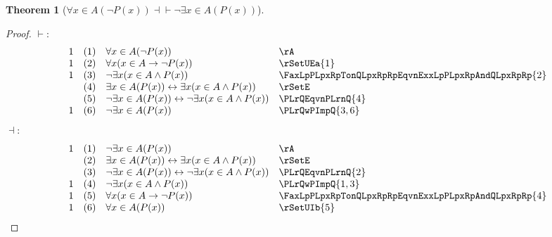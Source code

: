 \documentclass{book}
\theoremstyle{plain}
\newtheorem{theorem}{Theorem}
\theoremstyle{remark}
\theoremstyle{definition}
\begin{document}
\label{FaxInALpnPLpxRpRpEqvnExxInALpPLpxRpRp}
\begin{theorem}[\(\forall x \in A(\neg P(x)) \dashv\vdash \neg\exists x \in A(P(x))\)]
\end{theorem}
\begin{proof}
	\(\vdash:\)
	\[
	\begin{array}{llll}
		1 & (1) & \forall x \in A(\neg P(x)) & \rA \\
		1 & (2) & \forall x(x \in A \rightarrow \neg P(x)) & \rSetUEa{1} \\
		1 & (3) & \neg\exists x(x \in A \wedge P(x)) &  \FaxLpPLpxRpTonQLpxRpRpEqvnExxLpPLpxRpAndQLpxRpRp{2} \\
		& (4) & \exists x \in A(P(x)) \leftrightarrow \exists x(x \in A \wedge P(x)) & \rSetE \\
		& (5) & \neg \exists x \in A(P(x)) \leftrightarrow \neg \exists x(x \in A \wedge P(x)) & \PLrQEqvnPLrnQ{4} \\
		1 & (6) & \neg \exists x \in A(P(x)) & \PLrQwPImpQ{3,6} \\
	\end{array}
	\]
	\(\dashv:\)
	\[
	\begin{array}{llll}
		1 & (1) & \neg \exists x \in A(P(x)) & \rA \\
		& (2) & \exists x \in A(P(x)) \leftrightarrow \exists x(x \in A \wedge P(x)) & \rSetE \\
		& (3) & \neg \exists x \in A(P(x)) \leftrightarrow \neg \exists x(x \in A \wedge P(x)) & \PLrQEqvnPLrnQ{2} \\
		1 & (4) & \neg \exists x(x \in A \wedge P(x)) & \PLrQwPImpQ{1,3} \\
		1 & (5) & \forall x(x\in A\rightarrow \neg P(x)) & \FaxLpPLpxRpTonQLpxRpRpEqvnExxLpPLpxRpAndQLpxRpRp{4} \\
		1 & (6) & \forall x\in A(P(x)) & \rSetUIb{5}\\
	\end{array}
	\]
\end{proof}
\end{document}
